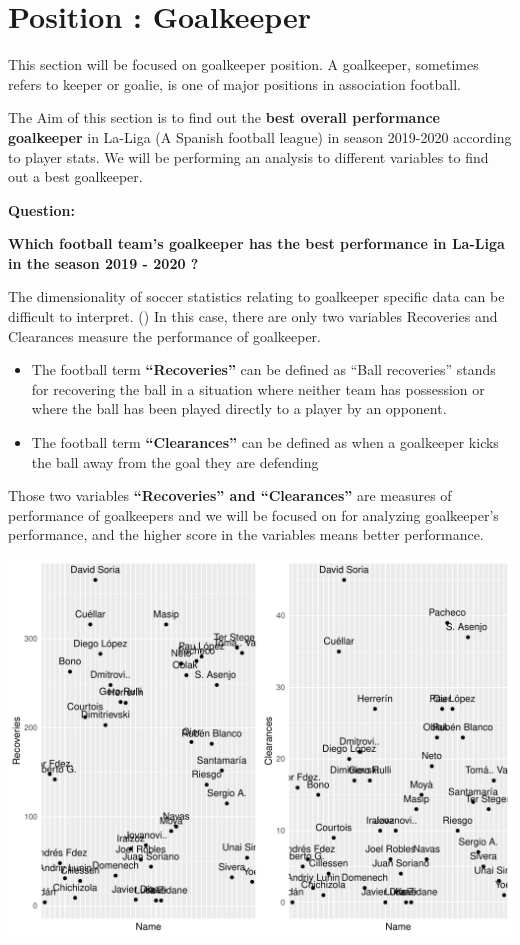 \documentclass[11pt,a4paper,]{article}
\let\origfigure\figure
\let\endorigfigure\endfigure
\renewenvironment{figure}[1][2] {
    \expandafter\origfigure\expandafter[H]
} {
    \endorigfigure
}
\begin{document}
\hypertarget{position-goalkeeper}{%
\section{Position : Goalkeeper}\label{position-goalkeeper}}

This section will be focused on goalkeeper position. A goalkeeper, sometimes refers to keeper or goalie, is one of major positions in association football.

The Aim of this section is to find out the \textbf{best overall performance goalkeeper} in La-Liga (A Spanish football league) in season 2019-2020 according to player stats. We will be performing an analysis to different variables to find out a best goalkeeper.

\textbf{Question:}

\textbf{Which football team's goalkeeper has the best performance in La-Liga in the season 2019 - 2020 ?}

The dimensionality of soccer statistics relating to goalkeeper specific data can be difficult to interpret. (\textcite{goalkeeper}) In this case, there are only two variables Recoveries and Clearances measure the performance of goalkeeper.

\begin{itemize}
\item
  The football term \textbf{``Recoveries''} can be defined as ``Ball recoveries'' stands for recovering the ball in a situation where neither team has possession or where the ball has been played directly to a player by an opponent.
\item
  The football term \textbf{``Clearances''} can be defined as when a goalkeeper kicks the ball away from the goal they are defending
\end{itemize}

Those two variables \textbf{``Recoveries'' and ``Clearances''} are measures of performance of goalkeepers and we will be focused on for analyzing goalkeeper's performance, and the higher score in the variables means better performance.

\begin{figure}[H]

{\centering \includegraphics[width=0.8\linewidth]{Assignment-4-ETC5513_files/figure-latex/graph-data-1} 

}

\caption{Recoveries and Clearances}\label{fig:graph-data}
\end{figure}
\end{document}
